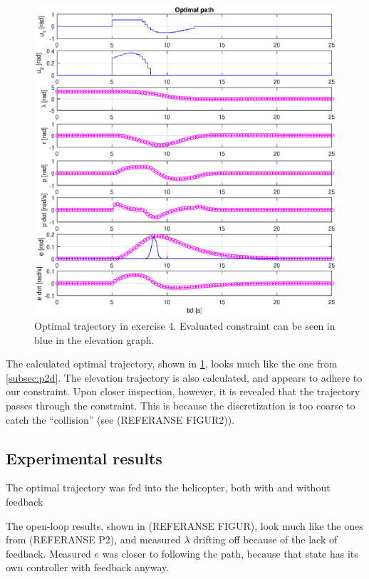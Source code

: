 \begin{figure}
    \includegraphics[width=\textwidth]{p4_trajectory.eps}
    \caption{Optimal trajectory in exercise 4. Evaluated constraint can be seen in blue in the elevation graph.}
    \label{fig:p4o}
\end{figure}

The calculated optimal trajectory, shown in \cref{fig:p4o}, looks much like the one from \cref{subsec:p2d}. The elevation trajectory is also calculated, and appears to adhere to our constraint. Upon closer inspection, however, it is revealed that the trajectory passes through the constraint. This is because the discretization is too coarse to catch the ``collision'' (see (REFERANSE FIGUR2)).

\subsection{Experimental results}
The optimal trajectory was fed into the helicopter, both with and without feedback

The open-loop results, shown in (REFERANSE FIGUR), look much like the ones from (REFERANSE P2), and measured $\lambda$ drifting off because of the lack of feedback. Measured $e$ was closer to following the path, because that state has its own controller with feedback anyway.


